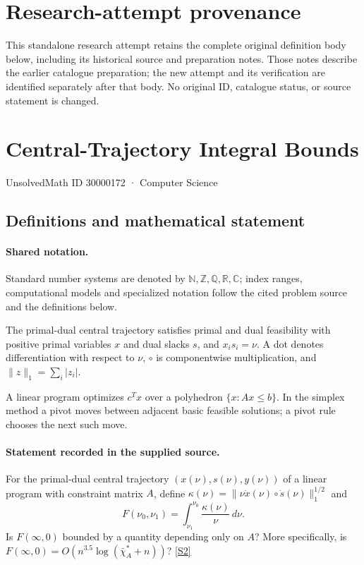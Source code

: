 \documentclass[11pt]{article}
\begin{document}
\section*{Research-attempt provenance}
This standalone research attempt retains the complete original definition body below,
including its historical source and preparation notes. Those notes describe the
earlier catalogue preparation; the new attempt and its verification are identified
separately after that body. No original ID, catalogue status, or source statement is changed.

\section{Central-Trajectory Integral Bounds}\label{30000172}
{\small UnsolvedMath ID 30000172 · Computer Science}
\subsection{Definitions and mathematical statement}

\paragraph{Shared notation.}Standard number systems are denoted by $\mathbb N,\mathbb Z,\mathbb Q,\mathbb R,\mathbb C$; index ranges, computational models and specialized notation follow the cited problem source and the definitions below.


The primal-dual central trajectory satisfies primal and dual feasibility with positive primal variables $x$ and dual slacks $s$, and $x_i s_i=\nu$. A dot denotes differentiation with respect to $\nu$, $\circ$ is componentwise multiplication, and $\lVert z\rVert_1=\sum_i|z_i|$.

A linear program optimizes $c^Tx$ over a polyhedron $\{x:Ax\leq b\}$. In the simplex method a pivot moves between adjacent basic feasible solutions; a pivot rule chooses the next such move.
\paragraph{Statement recorded in the supplied source.}
For the primal-dual central trajectory $(x(\nu),s(\nu),y(\nu))$ of a linear program with constraint matrix $A$, define $\kappa(\nu)=\lVert\nu\dot x(\nu)\circ\dot s(\nu)\rVert_1^{1/2}$ and $$F(\nu_0,\nu_1)=\int_{\nu_1}^{\nu_0}\frac{\kappa(\nu)}{\nu}\,d\nu.$$ Is $F(\infty,0)$ bounded by a quantity depending only on $A$? More specifically, is $F(\infty,0)=O\!\left(n^{3.5}\log(\bar\chi_A^*+n)\right)$? \href{https://doi.org/10.4171/owr/2005/02}{[S2]}
\end{document}
